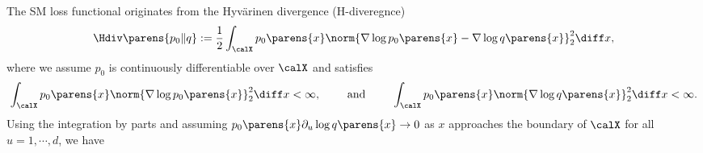 \documentclass[12pt]{article}
\theoremstyle{definition}
\theoremstyle{theorem}
\theoremstyle{remark}
\begin{document}
The SM loss functional originates from the Hyv{\"a}rinen divergence (H-diveregnce) \parencite{Hyvarinen2005-wp}
\begin{align}
	\Hdiv \parens{p_0 \Vert q} := \frac{1}{2} \int_{\calX} p_0 \parens{x} \norm{\nabla \log p_0 \parens{x} - \nabla \log q \parens{x}}_2^2 \diff x, 
\end{align}
where we assume $p_0$ is continuously differentiable over $\calX$ and satisfies 
\begin{align*}
	\int_{\calX} p_0 \parens{x} \norm{\nabla \log p_0 \parens{x}}_2^2 \diff x < \infty, \qquad \text{ and } \qquad \int_{\calX} p_0 \parens{x} \norm{\nabla \log q \parens{x}}_2^2 \diff x < \infty. 
\end{align*}
Using the integration by parts and assuming $p_0 \parens{x} \partial_u \log q \parens{x} \to 0$ as $x$ approaches the boundary of $\calX$ for all $u = 1, \cdots, d$, we have 
\end{document}
